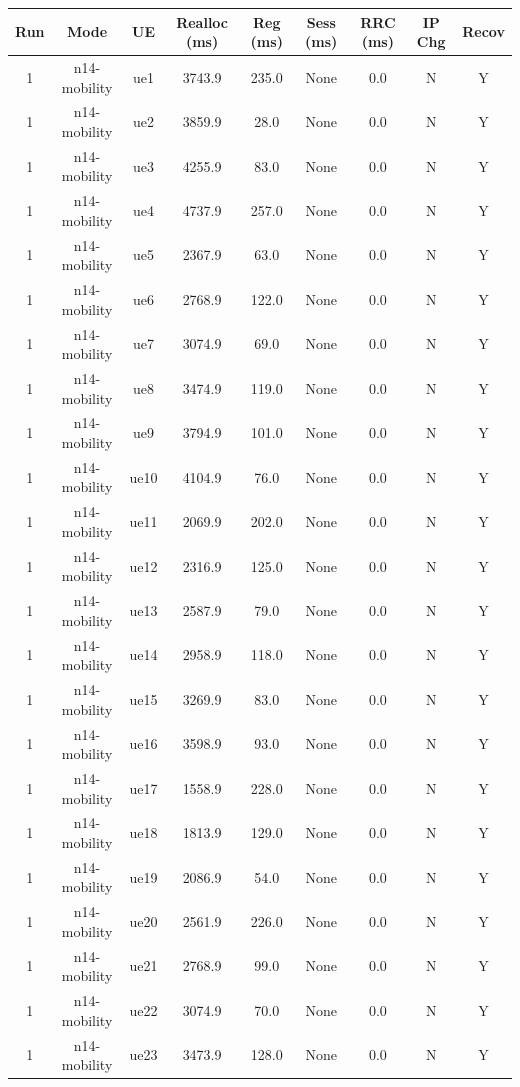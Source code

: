 \begin{table}[ht]
\centering
\begin{tabular}{|c|c|c|c|c|c|c|c|c|}
\hline
Run & Mode & UE & Realloc (ms) & Reg (ms) & Sess (ms) & RRC (ms) & IP Chg & Recov \\
\hline
1 & n14-mobility & ue1 & 3743.9 & 235.0 & None & 0.0 & N & Y \\
1 & n14-mobility & ue2 & 3859.9 & 28.0 & None & 0.0 & N & Y \\
1 & n14-mobility & ue3 & 4255.9 & 83.0 & None & 0.0 & N & Y \\
1 & n14-mobility & ue4 & 4737.9 & 257.0 & None & 0.0 & N & Y \\
1 & n14-mobility & ue5 & 2367.9 & 63.0 & None & 0.0 & N & Y \\
1 & n14-mobility & ue6 & 2768.9 & 122.0 & None & 0.0 & N & Y \\
1 & n14-mobility & ue7 & 3074.9 & 69.0 & None & 0.0 & N & Y \\
1 & n14-mobility & ue8 & 3474.9 & 119.0 & None & 0.0 & N & Y \\
1 & n14-mobility & ue9 & 3794.9 & 101.0 & None & 0.0 & N & Y \\
1 & n14-mobility & ue10 & 4104.9 & 76.0 & None & 0.0 & N & Y \\
1 & n14-mobility & ue11 & 2069.9 & 202.0 & None & 0.0 & N & Y \\
1 & n14-mobility & ue12 & 2316.9 & 125.0 & None & 0.0 & N & Y \\
1 & n14-mobility & ue13 & 2587.9 & 79.0 & None & 0.0 & N & Y \\
1 & n14-mobility & ue14 & 2958.9 & 118.0 & None & 0.0 & N & Y \\
1 & n14-mobility & ue15 & 3269.9 & 83.0 & None & 0.0 & N & Y \\
1 & n14-mobility & ue16 & 3598.9 & 93.0 & None & 0.0 & N & Y \\
1 & n14-mobility & ue17 & 1558.9 & 228.0 & None & 0.0 & N & Y \\
1 & n14-mobility & ue18 & 1813.9 & 129.0 & None & 0.0 & N & Y \\
1 & n14-mobility & ue19 & 2086.9 & 54.0 & None & 0.0 & N & Y \\
1 & n14-mobility & ue20 & 2561.9 & 226.0 & None & 0.0 & N & Y \\
1 & n14-mobility & ue21 & 2768.9 & 99.0 & None & 0.0 & N & Y \\
1 & n14-mobility & ue22 & 3074.9 & 70.0 & None & 0.0 & N & Y \\
1 & n14-mobility & ue23 & 3473.9 & 128.0 & None & 0.0 & N & Y \\

\end{tabular}
\end{table}
